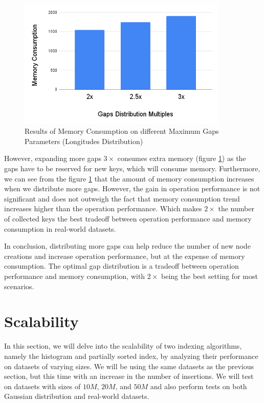 \begin{figure}[H]
    \centering
    \includegraphics[width=100mm,scale=1]{Figures/MemoryLogMaxGaps.png}
    \caption{
     Results of Memory Consumption on different Maximum Gaps Parameters (Longitudes Distribution)
    }
    \label{fig:MemoryLogMaxGaps}
\end{figure}
However, expanding more gaps $3\times$ consumes extra memory (figure \ref{fig:MemoryLogMaxGaps}) as the gaps have to be reserved for new keys, which will consume memory. Furthermore, we can see from the figure \ref{fig:MemoryLogMaxGaps} that the amount of memory consumption increases when we distribute more gaps. However, the gain in operation performance is not significant and does not outweigh the fact that memory consumption trend increases higher than the operation performance. Which makes $2\times$ the number of collected keys the best tradeoff between operation performance and memory consumption in real-world datasets.

In conclusion, distributing more gaps can help reduce the number of new node creations and increase operation performance, but at the expense of memory consumption. The optimal gap distribution is a tradeoff between operation performance and memory consumption, with $2\times$ being the best setting for most scenarios.

\section{Scalability}

In this section, we will delve into the scalability of two indexing algorithms, namely the histogram and partially sorted index, by analyzing their performance on datasets of varying sizes. We will be using the same datasets as the previous section, but this time with an increase in the number of insertions. We will test on datasets with sizes of $10M$, $20M$, and $50M$ and also perform tests on both Gaussian distribution and real-world datasets.

